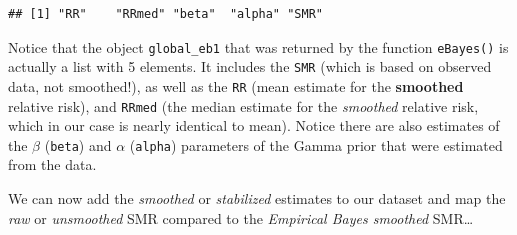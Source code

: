 \documentclass[
]{book}
\newenvironment{Shaded}{\begin{snugshade}}{\end{snugshade}}
\newcommand{\CommentTok}[1]{\textcolor[rgb]{0.56,0.35,0.01}{\textit{#1}}}
\newcommand{\NormalTok}[1]{#1}
\newcommand{\OtherTok}[1]{\textcolor[rgb]{0.56,0.35,0.01}{#1}}
\newcommand{\SpecialCharTok}[1]{\textcolor[rgb]{0.00,0.00,0.00}{#1}}
\begin{document}
\begin{verbatim}
## [1] "RR"    "RRmed" "beta"  "alpha" "SMR"
\end{verbatim}

Notice that the object \texttt{global\_eb1} that was returned by the function \texttt{eBayes()} is actually a list with 5 elements. It includes the \texttt{SMR} (which is based on observed data, not smoothed!), as well as the \texttt{RR} (mean estimate for the \textbf{smoothed} relative risk), and \texttt{RRmed} (the median estimate for the \emph{smoothed} relative risk, which in our case is nearly identical to mean). Notice there are also estimates of the \(\beta\) (\texttt{beta}) and \(\alpha\) (\texttt{alpha}) parameters of the Gamma prior that were estimated from the data.

We can now add the \emph{smoothed} or \emph{stabilized} estimates to our dataset and map the \emph{raw} or \emph{unsmoothed} SMR compared to the \emph{Empirical Bayes smoothed} SMR\ldots{}

\begin{Shaded}
\end{Shaded}
\end{document}

